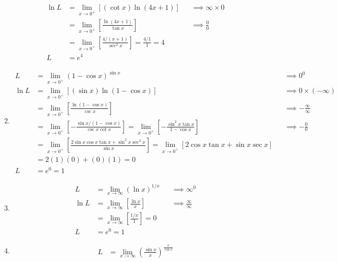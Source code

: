 \documentclass[12pt, A4]{report}
\begin{document}
\begin{enumerate}
\begin{align*}
						\ln L &= \lim_{x\to 0^+}[(\cot x)\ln(4x + 1)]
								&&\implies \infty \times 0 \\
							&= \lim_{x\to 0^+}\left[\frac{\ln(4x + 1)}{\tan x}\right]
								&&\implies \frac{0}{0} \\
							&= \lim_{x\to 0^+}\left[\frac{4/(x + 1)}{\sec^2 x}\right] 
								= \frac{4/1}{1} 
								= 4 \\
						L &= e^4
					\end{align*}
				\item
					\begin{align*}
						L &= \lim_{x\to 0^+}(1 - \cos x)^{\sin x}
								&&\implies 0^0 \\
						\ln L &= \lim_{x\to 0^+}\left[(\sin x)\ln(1 - \cos x)\right]
								&&\implies 0 \times (-\infty) \\
							&= \lim_{x\to 0^+}\left[\frac{\ln(1 - \cos x)}{\csc x}\right]
								&&\implies -\frac{\infty}{\infty} \\
							&= \lim_{x\to 0^+}\left[-\frac{\sin x /(1 - \cos x)}{\csc x \cot x}\right]
								= \lim_{x\to 0^+}\left[-\frac{\sin^2x\tan x}{1 - \cos x}\right]
								&&\implies -\frac{0}{0} \\
							&= \lim_{x\to 0^+}\left[\frac{2\sin x \cos x \tan x + \sin^2 x \sec^2 x}{\sin x}\right]
								= \lim_{x\to 0^+}[2\cos x \tan x + \sin x \sec x] \\
							&= 2(1)(0) + (0)(1) = 0 \\
						L &= e^0 = 1
					\end{align*}
				\item
					\begin{align*}
						L &= \lim_{x\to\infty} (\ln x)^{1/x}
								&&\implies \infty^0 \\
						\ln L &= \lim_{x\to\infty}\left[\frac{\ln x}{x}\right]
								&&\implies \frac{\infty}{\infty} \\
							&= \lim_{x\to\infty}\left[\frac{1/x}{1}\right] = 0 \\
						L &= e^0 = 1
					\end{align*}
				\item
					\begin{align*}
						L &= \lim_{x\to\infty}\left(\frac{\sin x}{x}\right)^{\frac{x}{\cos x}}
					\end{align*}
			\end{enumerate}
\end{document}
